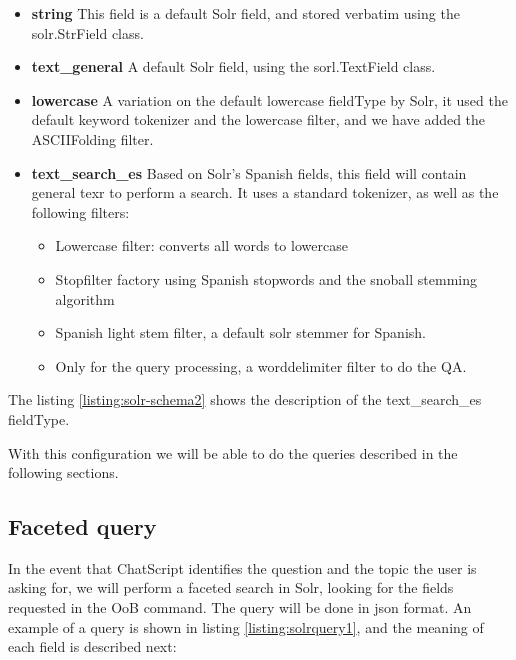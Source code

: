 \begin{itemize}
 \item \textbf{ string } This field is a default Solr field, and stored verbatim using the solr.StrField class.
 \item \textbf{ text\_general } A default Solr field, using the sorl.TextField class.
 \item \textbf{ lowercase } A variation on the default lowercase fieldType by Solr, it used the default keyword tokenizer and the lowercase filter, and we have added the ASCIIFolding filter.
 \item \textbf{ text\_search\_es } Based on Solr's Spanish fields, this field will contain general texr to perform a search. It uses a standard tokenizer, as well as the following filters:
 \begin{itemize}
  \item Lowercase filter: converts all words to lowercase 
  \item Stopfilter factory using Spanish stopwords and the snoball stemming algorithm
  \item Spanish light stem filter, a default solr stemmer for Spanish.
  \item Only for the query processing, a worddelimiter filter to do the QA.
 \end{itemize}
\end{itemize}

The listing \ref{listing:solr-schema2} shows the description of the text\_search\_es fieldType.

\begin{center}
  
\end{center}

With this configuration we will be able to do the queries described in the following sections.


\subsection{Faceted query}

In the event that ChatScript identifies the question and the topic the user is asking for, we will perform a faceted search in Solr, looking for the fields requested in the \ac{OoB} command. The query will be done in json format. An example of a query is shown in listing \ref{listing:solrquery1}, and the meaning of each field is described next:

